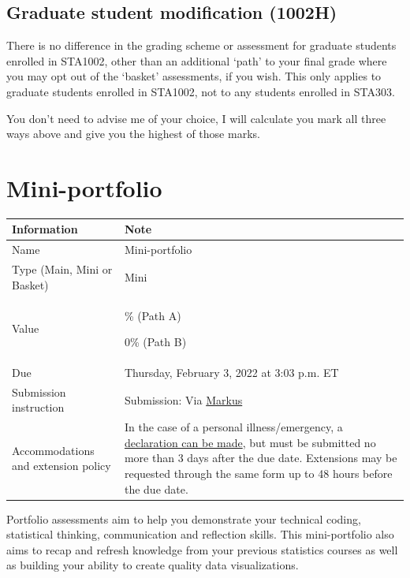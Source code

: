 \documentclass[
  openany]{book}
\begin{document}
\hypertarget{graduate-student-modification-1002h}{%
\section{Graduate student modification (1002H)}\label{graduate-student-modification-1002h}}

There is no difference in the grading scheme or assessment for graduate students enrolled in STA1002, other than an additional `path' to your final grade where you may opt out of the `basket' assessments, if you wish. This only applies to graduate students enrolled in STA1002, not to any students enrolled in STA303.

You don't need to advise me of your choice, I will calculate you mark all three ways above and give you the highest of those marks.

\hypertarget{mini-portfolio}{%
\chapter{Mini-portfolio}\label{mini-portfolio}}

\begin{longtable}[]{@{}
  >{\raggedright\arraybackslash}p{}
  >{\raggedright\arraybackslash}p{}@{}}
\toprule
\textbf{Information} & \textbf{Note} \\
\midrule
\endhead
Name & Mini-portfolio \\
Type (Main, Mini or Basket) & Mini \\
Value & 5\% (Path A)

0\% (Path B) \\
Due & Thursday, February 3, 2022 at 3:03 p.m. ET \\
Submission instruction & Submission: Via \href{https://markus-ds.teach.cs.toronto.edu/}{Markus} \\
Accommodations and extension policy & In the case of a personal illness/emergency, a \href{https://forms.office.com/Pages/ResponsePage.aspx?id=JsKqeAMvTUuQN7RtVsVSEOKHUU3SzAJJhmOKjJhDWEpUNTFDSzhZTFlXUzVYMVlNM1FEUTRZMkVWOC4u}{declaration can be made}, but must be submitted no more than 3 days after the due date. Extensions may be requested through the same form up to 48 hours before the due date. \\
\bottomrule
\end{longtable}

Portfolio assessments aim to help you demonstrate your technical coding, statistical thinking, communication and reflection skills. This mini-portfolio also aims to recap and refresh knowledge from your previous statistics courses as well as building your ability to create quality data visualizations.
\end{document}
